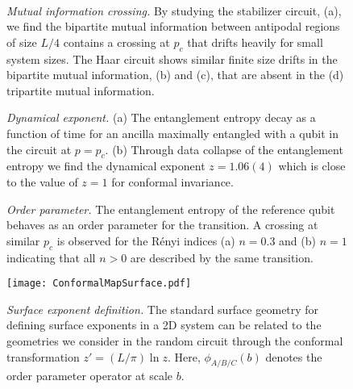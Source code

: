 \documentclass[prl,twocolumn,aps,showpacs,amsmath,amssymb,superscriptaddress,floatfix,longbibliography]{revtex4-1}
\begin{document}
\begin{figure}[htbp]
\\
\caption{\emph{Mutual information crossing.} By studying the stabilizer circuit, (a), we find the bipartite mutual information between antipodal regions of size $L/4$ contains a crossing at $p_c$ that drifts heavily for small system sizes. The Haar circuit shows similar finite size drifts in the bipartite mutual information, (b) and (c), that are absent in the (d) tripartite mutual information.}
\label{fig:crossComp}
\end{figure}


\begin{figure}[htbp]
\centering
{}
\caption{\emph{Dynamical exponent.} (a) The entanglement entropy decay as a function of time for an ancilla maximally entangled with a qubit in the circuit at $p = p_c$. (b) Through data collapse of the entanglement entropy we find the dynamical exponent $z = 1.06(4)$ which is close to the value of $z=1$ for conformal invariance.}
	\label{fig:z}
\end{figure}

\begin{figure}[htbp]
\centering
{}
\caption{\emph{Order parameter.} The entanglement entropy of the reference qubit behaves as an order parameter for the transition. A crossing at similar $p_c$ is observed for the R\'enyi indices (a) $n = 0.3$ and (b) $n = 1$ indicating that all $n>0$ are described by the same transition.}
	\label{fig:op}
\end{figure}


\begin{figure}[htbp]
\centering
\texttt{[image: ConformalMapSurface.pdf]}
\caption{\emph{Surface exponent definition.}  The standard surface geometry for defining surface exponents in a 2D system \cite{Binder83,Cardy84} can be related to the geometries we consider in the random circuit through the conformal transformation $z' = (L/\pi)\ln z$.  Here, $\phi_{A/B/C}(b)$ denotes the order parameter operator at scale $b$.}
\label{fig:conf}
\end{figure}
\end{document}
